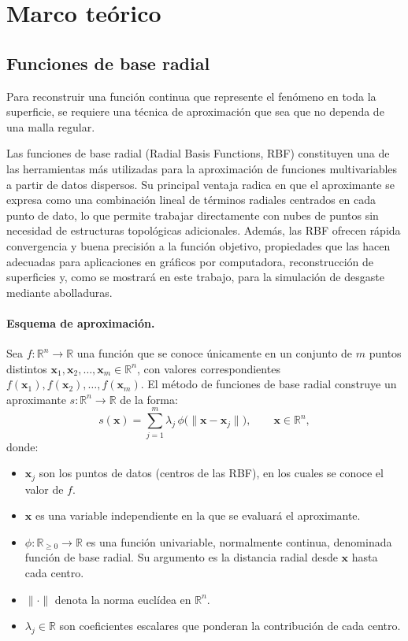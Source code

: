 \documentclass[12pt, letterpaper]{article}
\begin{document}
\section{Marco teórico}
\subsection{Funciones de base radial}

Para reconstruir una función continua que represente el fenómeno en toda la superficie, se requiere una técnica de aproximación que sea que no dependa de una malla regular.

Las funciones de base radial (Radial Basis Functions, RBF) constituyen una de las herramientas más utilizadas para la aproximación de funciones multivariables a partir de datos dispersos. Su principal ventaja radica en que el aproximante se expresa como una combinación lineal de términos radiales centrados en cada punto de dato, lo que permite trabajar directamente con nubes de puntos sin necesidad de estructuras topológicas adicionales. Además, las RBF ofrecen rápida convergencia y buena precisión a la función objetivo, propiedades que las hacen adecuadas para aplicaciones en gráficos por computadora, reconstrucción de superficies y, como se mostrará en este trabajo, para la simulación de desgaste mediante abolladuras.

\paragraph{Esquema de aproximación.}
Sea \(f: \mathbb{R}^n \to \mathbb{R}\) una función que se conoce únicamente en un conjunto de \(m\) puntos distintos \(\mathbf{x}_1, \mathbf{x}_2, \dots, \mathbf{x}_m \in \mathbb{R}^n\), con valores correspondientes \(f(\mathbf{x}_1), f(\mathbf{x}_2), \dots, f(\mathbf{x}_m)\). El método de funciones de base radial construye un aproximante \(s: \mathbb{R}^n \to \mathbb{R}\) de la forma:
\[
s(\mathbf{x}) = \sum_{j=1}^{m} \lambda_j \, \phi\bigl(\|\mathbf{x} - \mathbf{x}_j\|\bigr), \qquad \mathbf{x} \in \mathbb{R}^n, \tag{1}
\]
donde:
\begin{itemize}
    \item \(\mathbf{x}_j\) son los puntos de datos (centros de las RBF), en los cuales se conoce el valor de \(f\).
    \item \(\mathbf{x}\) es una variable independiente en la que se evaluará el aproximante.
    \item \(\phi: \mathbb{R}_{\ge 0} \to \mathbb{R}\) es una función univariable, normalmente continua, denominada función de base radial. Su argumento es la distancia radial desde \(\mathbf{x}\) hasta cada centro.
    \item \(\|\cdot\|\) denota la norma euclídea en \(\mathbb{R}^n\).
    \item \(\lambda_j \in \mathbb{R}\) son coeficientes escalares que ponderan la contribución de cada centro.
\end{itemize}
\end{document}
